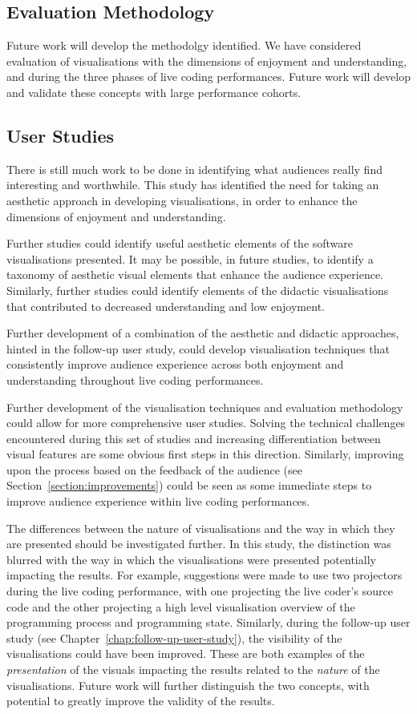 \subsection{Evaluation Methodology}

Future work will develop the methodolgy identified. We have considered evaluation of visualisations with the dimensions of  enjoyment and understanding, and during the three phases of live coding performances. Future work will develop and validate these concepts with large performance cohorts.

\subsection{User Studies}

There is still much work to be done in identifying what audiences really find interesting and worthwhile. This study has identified the need for taking an aesthetic approach in developing visualisations, in order to enhance the dimensions of enjoyment and understanding.

Further studies could identify useful aesthetic elements of the software visualisations presented. It may be possible, in future studies, to identify a taxonomy of aesthetic visual elements that enhance the audience experience. Similarly, further studies could identify elements of the didactic visualisations that contributed to decreased understanding and low enjoyment.

Further development of a combination of the aesthetic and didactic approaches, hinted in the follow-up user study, could develop visualisation techniques that consistently improve audience experience across both enjoyment and understanding throughout live coding performances.

Further development of the visualisation techniques and evaluation methodology could allow for more comprehensive user studies. Solving the technical challenges encountered during this set of studies and increasing differentiation between visual features are some obvious first steps in this direction. Similarly, improving upon the process based on the feedback of the audience (see Section~\ref{section:improvements}) could be seen as some immediate steps to improve audience experience within live coding performances. 

The differences between the nature of visualisations and the way in which they are presented should be investigated further. In this study, the distinction was blurred with the way in which the visualisations were presented potentially impacting the results. For example, suggestions were made to use two projectors during the live coding performance, with one projecting the live coder's source code and the other projecting a high level visualisation overview of the programming process and programming state. Similarly, during the follow-up user study (see Chapter~\ref{chap:follow-up-user-study}), the visibility of the visualisations could have been improved. These are both examples of the \textit{presentation} of the visuals impacting the results related to the \textit{nature} of the visualisations. Future work will further distinguish the two concepts, with potential to greatly improve the validity of the results.


